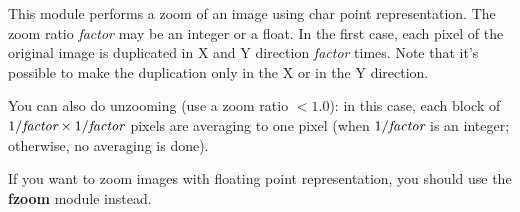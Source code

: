This module performs a zoom of an image using char point representation.
The zoom ratio {\em factor} may be an integer or a float.
In the first case, each pixel of the
original image is duplicated in X and Y direction {\em factor} times.
Note that it's possible to make the duplication only in the X or in the Y
direction.

You can also do unzooming (use a zoom ratio $< 1.0$): in this case, each block of $1/\mbox{\em factor} \times 1/\mbox{\em factor}$ pixels are averaging to one pixel (when $1/\mbox{\em factor}$ is an integer; otherwise, no averaging is done).

If you want to zoom images with floating point representation, you should use
the {\bf fzoom} module instead.

